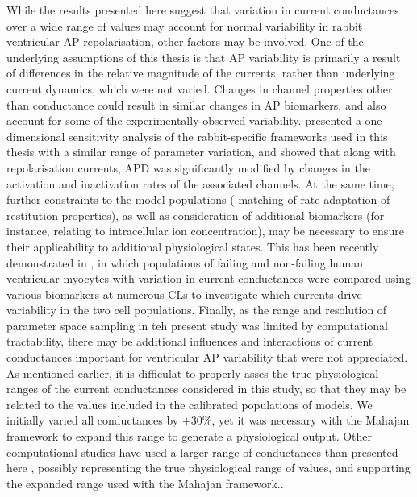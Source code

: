\documentclass[../thesis-main.tex]{subfiles}
\begin{document}
While the results presented here suggest that variation in current conductances over a wide range of values may account for normal variability in rabbit ventricular AP repolarisation, other factors may be involved. One of the underlying assumptions of this thesis is that AP variability is primarily a result of differences in the relative magnitude of the currents, rather than underlying current dynamics, which were not varied. Changes in channel properties other than conductance could result in similar changes in AP biomarkers, and also account for some of the experimentally observed variability. \citet{Romero2011} presented a one-dimensional sensitivity analysis of the rabbit-specific frameworks used in this thesis with a similar range of parameter variation, and showed that along with repolarisation currents, APD was significantly modified by changes in the activation and inactivation rates of the associated channels. At the same time, further constraints to the model populations (\eg{} matching of rate-adaptation of restitution properties), as well as consideration of additional biomarkers (for instance, relating to intracellular ion concentration), may be necessary to ensure their applicability to additional physiological states. This has been recently demonstrated in \citet{Walmsley2013}, in which populations of failing and non-failing human ventricular myocytes with variation in current conductances were compared using various biomarkers at numerous CLs to investigate which currents drive variability in the two cell populations. Finally, as the range and resolution of parameter space sampling in teh present study was limited by computational tractability, there may be additional influences and interactions of current conductances important for ventricular AP variability that were not appreciated. As mentioned earlier, it is difficulat to properly asses the true physiological ranges of the current conductances considered in this study, so that they may be related to the values included in the calibrated populations of models. We initially varied all conductances by $\pm30\%$, yet it was necessary with the Mahajan framework to expand this range to generate a physiological output. Other computational studies have used a larger range of conductances than presented here \citep{Sobie2009, Britton2013, Davies2012}, possibly representing the true physiological range of values, and supporting the expanded range used with the Mahajan framework..
\end{document}
